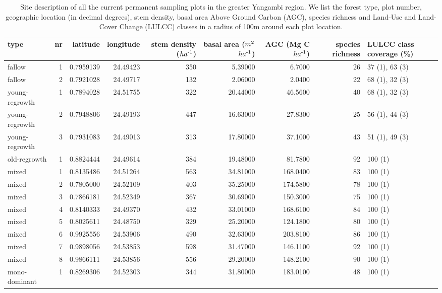 \documentclass[landscape]{article}
\begin{document}
\begin{table}[!h]

\caption{\label{tab:unnamed-chunk-2}Site description of all the current permanent sampling plots in the greater Yangambi region. We list the forest type, plot number, geographic location (in decimal degrees), stem density, basal area Above Ground Carbon (AGC), species richness and Land-Use and Land-Cover Change (LULCC) classes in a radius of 100m around each plot location.}
\centering
\begin{tabular}[t]{lrrrrrrrl}
\toprule
type & nr & latitude & longitude & stem density ($ha\textsuperscript{-1}$) & basal area ($m\textsuperscript{2}$ $ha\textsuperscript{-1}$) & AGC (Mg C $ha\textsuperscript{-1}$) & species richness & LULCC class coverage (\%)\\
\midrule
fallow & 1 & 0.7959139 & 24.49423 & 350 & 5.39000 & 6.7000 & 26 & 37 (1), 63 (3)\\
fallow & 2 & 0.7921028 & 24.49717 & 132 & 2.06000 & 2.0400 & 22 & 68 (1), 32 (3)\\
young-regrowth & 1 & 0.7894028 & 24.51755 & 322 & 20.44000 & 46.5600 & 40 & 68 (1), 32 (3)\\
young-regrowth & 2 & 0.7948806 & 24.49193 & 447 & 16.63000 & 27.8300 & 25 & 56 (1), 44 (3)\\
young-regrowth & 3 & 0.7931083 & 24.49013 & 313 & 17.80000 & 37.1000 & 43 & 51 (1), 49 (3)\\
\addlinespace
old-regrowth & 1 & 0.8824444 & 24.49614 & 384 & 19.48000 & 81.7800 & 92 & 100 (1)\\
mixed & 1 & 0.8135486 & 24.51264 & 563 & 34.81000 & 168.0400 & 83 & 100 (1)\\
mixed & 2 & 0.7805000 & 24.52109 & 403 & 35.25000 & 174.5800 & 78 & 100 (1)\\
mixed & 3 & 0.7866181 & 24.52349 & 367 & 30.69000 & 150.3000 & 75 & 100 (1)\\
mixed & 4 & 0.8140333 & 24.49370 & 432 & 33.01000 & 168.6100 & 84 & 100 (1)\\
\addlinespace
mixed & 5 & 0.8025611 & 24.48750 & 329 & 25.20000 & 124.1800 & 80 & 100 (1)\\
mixed & 6 & 0.9925556 & 24.53906 & 490 & 32.63000 & 203.8100 & 86 & 100 (1)\\
mixed & 7 & 0.9898056 & 24.53853 & 598 & 31.47000 & 146.1100 & 92 & 100 (1)\\
mixed & 8 & 0.9866111 & 24.53856 & 556 & 29.20000 & 148.2100 & 90 & 100 (1)\\
mono-dominant & 1 & 0.8269306 & 24.52303 & 344 & 31.80000 & 183.0100 & 48 & 100 (1)\\

\end{tabular}
\end{table}
\end{document}
